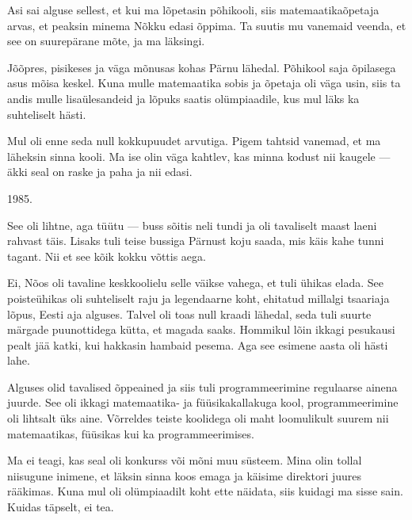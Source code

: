 
Asi sai alguse sellest, et kui ma lõpetasin põhikooli, siis 
matemaatikaõpetaja arvas, et peaksin minema Nõkku edasi õppima. Ta suutis mu vanemaid veenda, et see on suurepärane 
mõte, ja ma läksingi.


Jõõpres, pisikeses ja väga mõnusas kohas Pärnu 
lähedal. Põhikool saja õpilasega asus mõisa keskel. Kuna mulle matemaatika 
sobis ja õpetaja oli väga usin, siis ta andis mulle lisaülesandeid 
ja lõpuks saatis olümpiaadile, kus mul läks ka suhteliselt hästi.



Mul oli enne seda null kokkupuudet arvutiga. Pigem tahtsid vanemad, et ma läheksin sinna kooli. Ma ise olin väga kahtlev, kas minna kodust 
nii kaugele --- äkki seal on raske ja paha ja nii edasi. 


1985. 


See oli lihtne, aga tüütu --- buss sõitis neli tundi 
ja oli tavaliselt maast laeni rahvast täis. Lisaks tuli teise bussiga Pärnust koju saada, mis
käis kahe tunni tagant. Nii et see kõik kokku võttis aega.  


Ei, Nõos oli tavaline keskkoolielu selle väikse vahega, et tuli ühikas 
elada. See poisteühikas oli 
suhteliselt raju ja legendaarne koht, ehitatud millalgi tsaariaja lõpus, Eesti 
aja alguses. Talvel oli toas null kraadi lähedal, seda tuli suurte 
märgade puunottidega kütta, et magada saaks. Hommikul lõin ikkagi pesukausi pealt jää katki, 
kui hakkasin hambaid pesema. Aga see esimene aasta oli hästi lahe. 

Alguses olid tavalised õppeained ja siis tuli programmeerimine 
regulaarse ainena juurde. See oli ikkagi matemaatika- ja 
füüsikakallakuga kool, programmeerimine oli lihtsalt üks
aine. Võrreldes teiste koolidega oli maht loomulikult suurem nii 
matemaatikas, füüsikas kui ka programmeerimises.


Ma ei teagi, kas seal oli konkurss või mõni muu süsteem. Mina olin tollal niisugune inimene, et läksin sinna koos emaga ja käisime direktori juures rääkimas. Kuna mul oli 
olümpiaadilt koht ette näidata, siis kuidagi ma 
sisse sain. Kuidas täpselt, ei tea. 

